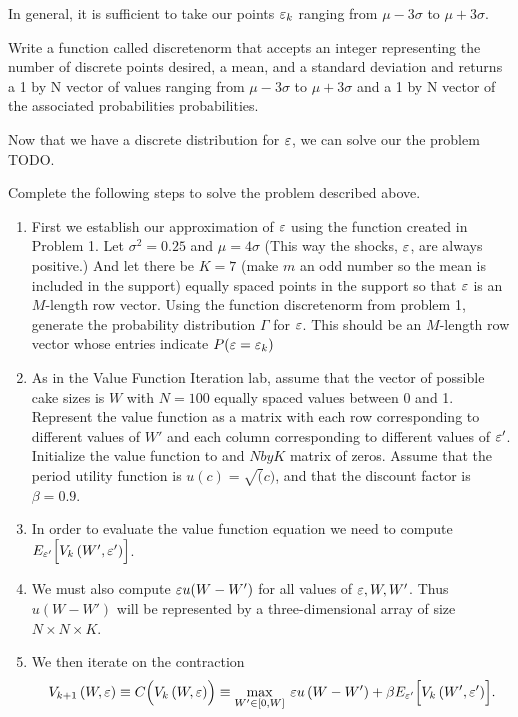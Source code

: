 In general, it is sufficient to take our points $\varepsilon_k$ ranging from $\mu - 3\sigma$ to $\mu + 3\sigma$.

\begin{problem}
Write a function called discretenorm that accepts an integer representing the number of discrete points desired, a mean, and a standard deviation and returns a 1 by N vector of values ranging from $\mu - 3\sigma$ to $\mu + 3\sigma$  and a 1 by N vector of the associated probabilities probabilities.
\end{problem}

Now that we have a discrete distribution for $\varepsilon$, we can solve our the problem TODO.

\begin{problem}
Complete the following steps to solve the problem described above.
\begin{enumerate}
   \item First we establish our approximation of $\varepsilon$ using the function created in Problem 1. Let $\sigma^2 = 0.25$ and $\mu=4\sigma$ (This way the shocks, $\varepsilon$, are always positive.) And let there be $K=7$ (make $m$ an odd number so the mean is included in the support) equally spaced points in the support so that $\varepsilon$ is an $M$-length row vector.  Using the function discretenorm from problem 1, generate the probability distribution $\Gamma$ for $\varepsilon$. This should be an $M$-length row vector whose entries indicate $P(\varepsilon = \varepsilon_k)$

   \item As in the Value Function Iteration lab, assume that the vector of possible cake sizes is $W$ with $N=100$ equally spaced values between 0 and 1.  Represent the value function as a matrix with each row corresponding to different values of $W'$ and each column corresponding to different values of $\varepsilon'$. Initialize the value function to and $N by K$ matrix of zeros.  Assume that the period utility function is $u(c)=\sqrt(c)$, and that the discount factor is $\beta = 0.9$.  
       
   \item In order to evaluate the value function equation we need to compute $E_{\varepsilon'}\Bigl[V_k\left(W',\varepsilon'\right)\Bigr]$.
       
   \item We must also compute $\varepsilon u(W-W')$ for all values of $\varepsilon,W,W'$.  Thus $u(W-W')$ will be represented by a three-dimensional array of size $N\times N\times K$.
   \item We then iterate on the contraction \begin{equation}\label{EqContractStochiid}
      V_{k+1}\left(W,\varepsilon\right) \equiv C\Bigl(V_k\left(W,\varepsilon\right)\Bigr) \equiv \max_{W'\in[0,W]}\: \varepsilon u\left(W-W'\right) + \beta E_{\varepsilon'}\Bigl[V_k\left(W',\varepsilon'\right)\Bigr].  
   \end{equation}


\end{enumerate}
\end{problem}
